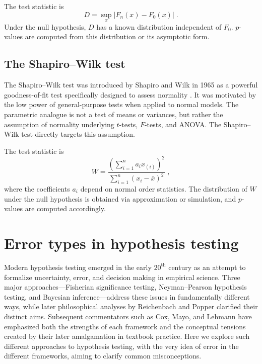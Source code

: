 The test statistic is
\[
    D = \sup_x |F_n(x) - F_0(x)| \; .
\]
Under the null hypothesis, \(D\) has a known distribution independent of \(F_0\). \(p\)-values are computed from this distribution or its asymptotic form.

\subsection{The Shapiro--Wilk test}

The Shapiro--Wilk test was introduced by Shapiro and Wilk in 1965 as a powerful goodness-of-fit test specifically designed to assess normality \cite{shapiro_wilk_1965_normality}. It was motivated by the low power of general-purpose tests when applied to normal models. The parametric analogue is not a test of means or variances, but rather the assumption of normality underlying \(t\)-tests, \(F\)-tests, and ANOVA. The Shapiro--Wilk test directly targets this assumption.

The test statistic is
\[
    W = \frac{\left(\sum_{i=1}^n a_i x_{(i)}\right)^2}{\sum_{i=1}^n (x_i - \bar{x})^2} \; ,
\]
where the coefficients \(a_i\) depend on normal order statistics. The distribution of \(W\) under the null hypothesis is obtained via approximation or simulation, and \(p\)-values are computed accordingly.

\section{Error types in hypothesis testing}

Modern hypothesis testing emerged in the early $20^{\text{th}}$ century as an attempt to formalize uncertainty, error, and decision making in empirical science.  Three major approaches—Fisherian significance testing, Neyman–Pearson hypothesis testing, and Bayesian inference—address these issues in fundamentally different ways, while later philosophical analyses by Reichenbach and Popper clarified their distinct aims.  Subsequent commentators such as Cox, Mayo, and Lehmann have emphasized both the strengths of each framework and the conceptual tensions created by their later amalgamation in textbook practice. Here we explore such different approaches to hypothesis testing, with the very idea of error in the different frameworks, aiming to clarify common misconceptions.


